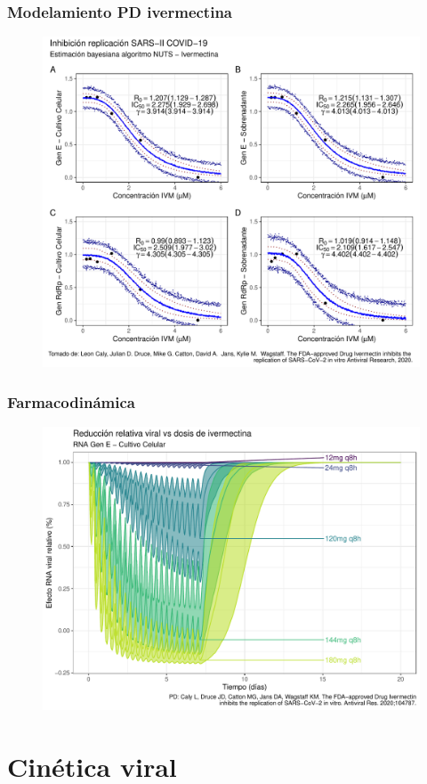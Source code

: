 \documentclass[12pt]{beamer}
\begin{document}
	\begin{frame}
		\frametitle{Modelamiento PD ivermectina}
		\begin{figure}
			\centering
			\includegraphics[width=0.8\linewidth]{../modelo_PD/modelo_ivermectina}
			\label{fig:modeloivermectina}
		\end{figure}
	\end{frame}
	
	\begin{frame}	
		\frametitle{Farmacodinámica}		
		\begin{figure}
			\centering
			\includegraphics[width=0.9\linewidth]{../modelo_PD_2/figuras/G2}
			\label{fig:g1}
		\end{figure}
	\end{frame}
	
	\section{Cinética viral}
	
\end{document}
